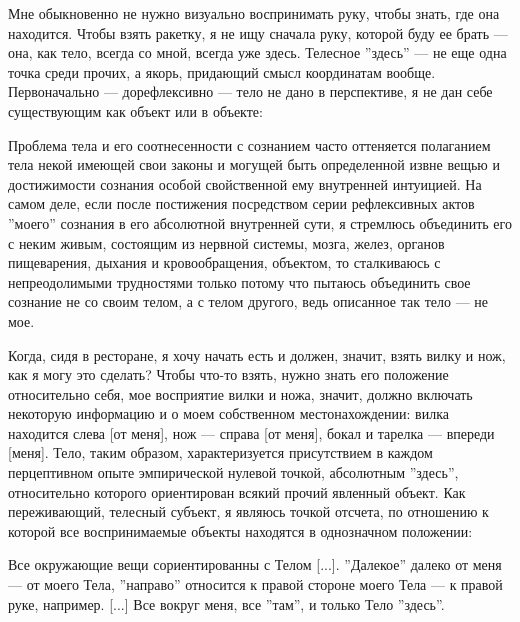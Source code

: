\documentclass[11pt]{book}
\begin{document}
Мне обыкновенно не нужно визуально воспринимать руку, чтобы знать, где она находится. Чтобы взять ракетку, я не ищу сначала руку, которой буду ее брать --- она, как тело, всегда со мной, всегда уже здесь. Телесное ''здесь'' --- не еще одна точка среди прочих, а якорь, придающий смысл координатам вообще. Первоначально --- дорефлексивно --- тело не дано в перспективе, я не дан себе существующим как объект или в объекте:

\smallskip
{}\relax
{}\relax

Проблема тела и его соотнесенности с сознанием часто оттеняется полаганием тела некой имеющей свои законы и могущей быть определенной извне вещью и достижимости сознания особой свойственной ему внутренней интуицией. На самом деле, если после постижения посредством серии рефлексивных актов ''моего'' сознания в его абсолютной внутренней сути, я стремлюсь объединить его с неким живым, состоящим из нервной системы, мозга, желез, органов пищеварения, дыхания и кровообращения, объектом, то сталкиваюсь с непреодолимыми трудностями только потому что пытаюсь объединить свое сознание не со своим телом, а с телом другого, ведь описанное так тело --- не мое.

\relax
{}\relax
\smallskip

Когда, сидя в ресторане, я хочу начать есть и должен, значит, взять вилку и нож, как я могу это сделать? Чтобы что-то взять, нужно знать его положение относительно себя, мое восприятие вилки и ножа, значит, должно включать некоторую информацию и о моем собственном местонахождении: вилка находится слева [от меня], нож --- справа [от меня], бокал и тарелка --- впереди [меня]. Тело, таким образом, характеризуется присутствием в каждом перцептивном опыте эмпирической нулевой точкой, абсолютным ''здесь'', относительно которого ориентирован всякий прочий явленный объект. Как переживающий, телесный субъект, я являюсь точкой отсчета, по отношению к которой все воспринимаемые объекты находятся в однозначном положении:

\smallskip
{}\relax
{}\relax

Все окружающие вещи сориентированны с Телом [...]. ''Далекое'' далеко от меня --- от моего Тела, ''направо'' относится к правой стороне моего Тела --- к правой руке, например. [...] Все вокруг меня, все ''там'', и только Тело ''здесь''.

\relax
{}\relax
\smallskip
\end{document}
